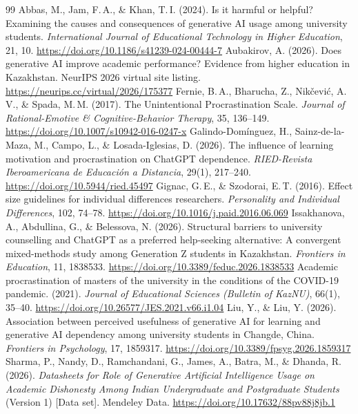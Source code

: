 \documentclass[11pt,a4paper]{article}
\begin{document}
\begin{thebibliography}{99}\small
{} Abbas, M., Jam, F.\,A., \& Khan, T.\,I. (2024). Is it harmful or helpful? Examining the causes and consequences of generative AI usage among university students. \emph{International Journal of Educational Technology in Higher Education}, 21, 10. \url{https://doi.org/10.1186/s41239-024-00444-7}
 Aubakirov, A. (2026). Does generative AI improve academic performance? Evidence from higher education in Kazakhstan. NeurIPS 2026 virtual site listing. \url{https://neurips.cc/virtual/2026/175377}
 Fernie, B.\,A., Bharucha, Z., Nik\v{c}evi\'c, A.\,V., \& Spada, M.\,M. (2017). The Unintentional Procrastination Scale. \emph{Journal of Rational-Emotive \& Cognitive-Behavior Therapy}, 35, 136--149. \url{https://doi.org/10.1007/s10942-016-0247-x}
 Galindo-Dom\'inguez, H., Sainz-de-la-Maza, M., Campo, L., \& Losada-Iglesias, D. (2026). The influence of learning motivation and procrastination on ChatGPT dependence. \emph{RIED-Revista Iberoamericana de Educaci\'on a Distancia}, 29(1), 217--240. \url{https://doi.org/10.5944/ried.45497}
 Gignac, G.\,E., \& Szodorai, E.\,T. (2016). Effect size guidelines for individual differences researchers. \emph{Personality and Individual Differences}, 102, 74--78. \url{https://doi.org/10.1016/j.paid.2016.06.069}
 Issakhanova, A., Abdullina, G., \& Belessova, N. (2026). Structural barriers to university counselling and ChatGPT as a preferred help-seeking alternative: A convergent mixed-methods study among Generation Z students in Kazakhstan. \emph{Frontiers in Education}, 11, 1838533. \url{https://doi.org/10.3389/feduc.2026.1838533}
 Academic procrastination of masters of the university in the conditions of the COVID-19 pandemic. (2021). \emph{Journal of Educational Sciences (Bulletin of KazNU)}, 66(1), 35--40. \url{https://doi.org/10.26577/JES.2021.v66.i1.04}
 Liu, Y., \& Liu, Y. (2026). Association between perceived usefulness of generative AI for learning and generative AI dependency among university students in Changde, China. \emph{Frontiers in Psychology}, 17, 1859317. \url{https://doi.org/10.3389/fpsyg.2026.1859317}
 Sharma, P., Nandy, D., Ramchandani, G., James, A., Batra, M., \& Dhanda, R. (2026). \emph{Datasheets for Role of Generative Artificial Intelligence Usage on Academic Dishonesty Among Indian Undergraduate and Postgraduate Students} (Version 1) [Data set]. Mendeley Data. \url{https://doi.org/10.17632/88pv88j8jb.1}

\end{thebibliography}
\end{document}
